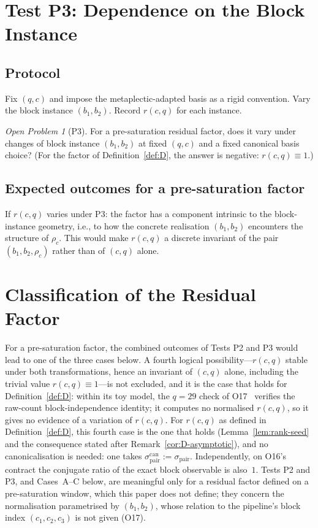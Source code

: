 \documentclass[11pt,a4paper]{article}
\theoremstyle{remark}
\newtheorem{openproblem}[theorem]{Open Problem}
\newcommand{\sigmapair}{\sigma_{\mathrm{pair}}}
\newcommand{\sigmacan}{\sigma_{\mathrm{pair}}^{\mathrm{can}}}
\newcommand{\rcq}{r(c,q)}
\begin{document}
  \section{Test P3: Dependence on the Block Instance}
  \label{sec:testP3}

  \subsection{Protocol}

    Fix $(q, c)$ and impose the metaplectic-adapted basis as a rigid convention.
    Vary the block instance $(b_{1}, b_{2})$.
    Record $\rcq$ for each instance.

    \begin{openproblem}[P3]
      \label{op:P3}
      For a pre-saturation residual factor, does it vary under changes of block instance
      $(b_{1}, b_{2})$ at fixed $(q, c)$ and a fixed canonical basis choice?
      (For the factor of Definition~\ref{def:D}, the answer is negative: $\rcq \equiv 1$.)
    \end{openproblem}

  \subsection{Expected outcomes for a pre-saturation factor}

    If $\rcq$ varies under P3: the factor has a component intrinsic to the
    block-instance geometry, i.e., to how the concrete realisation $(b_{1}, b_{2})$
    encounters the structure of $\rho_{c}$.
    This would make $\rcq$ a discrete invariant of the pair
    $(b_{1}, b_{2}, \rho_{c})$ rather than of $(c, q)$ alone.

  \section{Classification of the Residual Factor}
  \label{sec:classification}


  For a pre-saturation factor, the combined outcomes of Tests P2 and P3 would lead to one of the three
  cases below.
  A fourth logical possibility---$\rcq$ stable under both transformations,
  hence an invariant of $(c, q)$ alone, including the trivial value $\rcq \equiv 1$---is
  not excluded, and it is the case that holds for Definition~\ref{def:D}: within its toy model, the $q = 29$ check of O17~\cite{Beau2026a21} verifies the
  raw-count block-independence identity; it computes no normalised $\rcq$, so it gives no evidence
  of a variation of $\rcq$.
  For $\rcq$ as defined in Definition~\ref{def:D}, this fourth case is the one that holds
  (Lemma~\ref{lem:rank-seed} and the consequence stated after Remark~\ref{cor:D-asymptotic}), and
  no canonicalisation is needed: one takes $\sigmacan := \sigmapair$.
  Independently, on O16's contract the conjugate ratio of the exact block observable is also~$1$.
  Tests P2 and P3, and Cases~A--C below, are meaningful only for a residual factor defined on a
  pre-saturation window, which this paper does not define; they concern the normalisation
  parametrised by $(b_{1}, b_{2})$, whose relation to the pipeline's block index $(c_1,c_2,c_3)$ is
  not given (O17).
\end{document}
